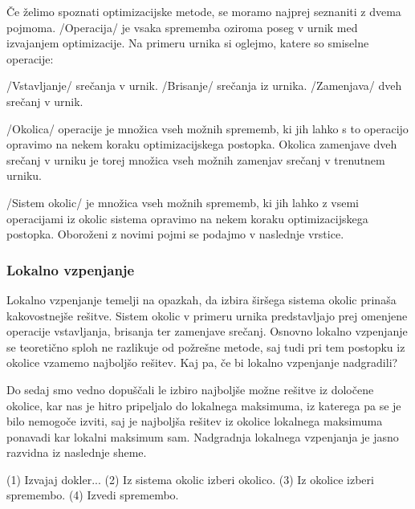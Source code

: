 \documentclass[a4paper,10pt]{article}
\begin{document}
   Če želimo spoznati optimizacijske metode, se moramo najprej seznaniti z dvema pojmoma.
   /Operacija/ je vsaka sprememba oziroma poseg v urnik med izvajanjem optimizacije.
   Na primeru urnika si oglejmo, katere so smiselne operacije:
   
      /Vstavljanje/ srečanja v urnik.
      /Brisanje/ srečanja iz urnika.
      /Zamenjava/ dveh srečanj v urnik.
   
   /Okolica/ operacije je množica vseh možnih sprememb, ki jih lahko s to operacijo
   opravimo na nekem koraku optimizacijskega postopka. Okolica zamenjave dveh srečanj v urniku
   je torej množica vseh možnih zamenjav srečanj v trenutnem urniku.
   
   /Sistem okolic/ je množica vseh možnih sprememb, ki jih lahko z vsemi operacijami iz
   okolic sistema opravimo na nekem koraku optimizacijskega postopka. Oboroženi z novimi pojmi
   se podajmo v naslednje vrstice.
   
\subsubsection{   Lokalno vzpenjanje}
   
   Lokalno vzpenjanje temelji na opazkah, da izbira širšega sistema okolic prinaša kakovostnejše
   rešitve. Sistem okolic v primeru urnika predstavljajo prej omenjene operacije vstavljanja,
   brisanja ter zamenjave srečanj. Osnovno lokalno vzpenjanje se teoretično sploh ne razlikuje
   od požrešne metode, saj tudi pri tem postopku iz okolice vzamemo najboljšo rešitev. Kaj pa,
   če bi lokalno vzpenjanje nadgradili?
   
   Do sedaj smo vedno dopuščali le izbiro najboljše možne rešitve iz določene okolice, kar nas
   je hitro pripeljalo do lokalnega maksimuma, iz katerega pa se je bilo nemogoče izviti, saj
   je najboljša rešitev iz okolice lokalnega maksimuma ponavadi kar lokalni maksimum sam.
   Nadgradnja lokalnega vzpenjanja je jasno razvidna iz naslednje sheme.
   
   (1) Izvajaj dokler...
   {
      (2) Iz sistema okolic izberi okolico.
      (3) Iz okolice izberi spremembo.
      (4) Izvedi spremembo.
   }
   
\end{document}

